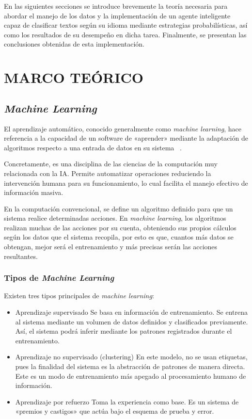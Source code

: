 \documentclass[sigconf]{acmart}
\begin{document}
En las siguientes secciones se introduce brevemente la teoría necesaria para abordar el manejo de los datos y la implementación de un agente inteligente capaz de clasificar textos según su idioma mediante estrategias probabilísticas, así como los resultados de su desempeño en dicha tarea. Finalmente, se presentan las conclusiones obtenidas de esta implementación.


\section{MARCO TEÓRICO}

\subsection{{\itshape Machine Learning}}
El aprendizaje automático, conocido generalmente como {\itshape machine learning}, hace referencia a la capacidad de un software de «aprender» mediante la adaptación de algoritmos respecto a una entrada de datos en su sistema ~\cite{apd}.

Concretamente, es una disciplina de las ciencias de la computación muy relacionada con la IA. Permite automatizar operaciones reduciendo la intervención humana para su funcionamiento, lo cual facilita el manejo efectivo de información masiva.

En la computación convencional, se define un algoritmo definido para que un sistema realice determinadas acciones. En {\itshape machine learning}, los algoritmos realizan muchas de las acciones por su cuenta, obteniendo sus propios cálculos según los datos que el sistema recopila, por esto es que, cuantos más datos se obtengan, mejor será el entrenamiento y más precisas serán las acciones resultantes.

\subsubsection{Tipos de {\itshape Machine Learning}} Existen tres tipos principales de {\itshape machine learning}:

\begin{itemize}
    \item Aprendizaje supervisado \newline
    Se basa en información de entrenamiento. Se entrena al sistema mediante un volumen de datos definidos y clasificados previamente. Así, el sistema podrá inferir mediante los patrones registrados durante el entrenamiento.
    \item Aprendizaje no supervisado (clustering) \newline
    En este modelo, no se usan etiquetas, pues la finalidad del sistema es la abstracción de patrones de manera directa. Este es un modo de entrenamiento más apegado al procesamiento humano de información.
    \item Aprendizaje por refuerzo \newline
    Toma la experiencia como base. Es un sistema de «premios y castigos» que actúa bajo el esquema de prueba y error.
\end{itemize}
\end{document}
